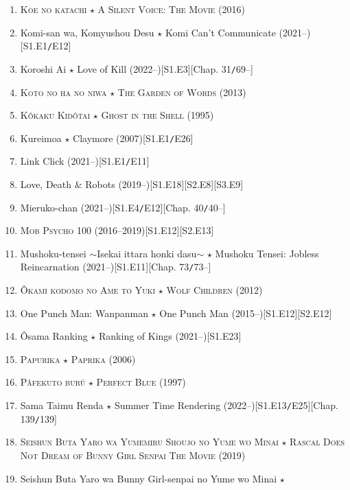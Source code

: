 \documentclass[oneside]{book}
\numberwithin{equation}{section}
\begin{document}
\begin{enumerate}
    \item \textsc{Koe no katachi $\star$ A Silent Voice: The Movie} (2016)
    \item Komi-san wa, Komyushou Desu $\star$ Komi Can't Communicate (2021--)\hfill[S1.E1\texttt{/}E12]
    \item Koroshi Ai $\star$ Love of Kill (2022--)\hfill[S1.E3][Chap. 31\texttt{/}69--]
    \item \textsc{Koto no ha no niwa $\star$ The Garden of Words} (2013)
    \item \textsc{K\^okaku Kid\^otai $\star$ Ghost in the Shell} (1995)
    \item Kureimoa $\star$ Claymore (2007)\hfill[S1.E1\texttt{/}E26]
    \item Link Click (2021--)\hfill[S1.E1\texttt{/}E11]
    \item Love, Death \& Robots (2019--)\hfill[S1.E18][S2.E8][S3.E9]
    \item Mieruko-chan (2021--)\hfill[S1.E4\texttt{/}E12][Chap. 40\texttt{/}40--]
    \item \textsc{Mob Psycho 100} (2016--2019)\hfill[S1.E12][S2.E13]
    \item Mushoku-tensei $\sim$Isekai ittara honki dasu$\sim$ $\star$ Mushoku Tensei: Jobless Reincarnation (2021--)\hfill[S1.E11][Chap. 73\texttt{/}73--]
    \item \textsc{\^Okami kodomo no Ame to Yuki $\star$ Wolf Children} (2012)
    \item One Punch Man: Wanpanman $\star$ One Punch Man (2015--)\hfill[S1.E12][S2.E12]
    \item \^Osama Ranking $\star$ Ranking of Kings (2021--)\hfill[S1.E23]
    \item \textsc{Papurika $\star$ Paprika} (2006)
    \item \textsc{Pâfekuto burû $\star$ Perfect Blue} (1997)
    \item Sama Taimu Renda $\star$ Summer Time Rendering (2022--)\hfill[S1.E13\texttt{/}E25][Chap. 139\texttt{/}139]
    \item \textsc{Seishun Buta Yaro wa Yumemiru Shoujo no Yume wo Minai $\star$ Rascal Does Not Dream of Bunny Girl Senpai The Movie} (2019)
    \item Seishun Buta Yaro wa Bunny Girl-senpai no Yume wo Minai $\star$
    

\end{enumerate}
\end{document}
